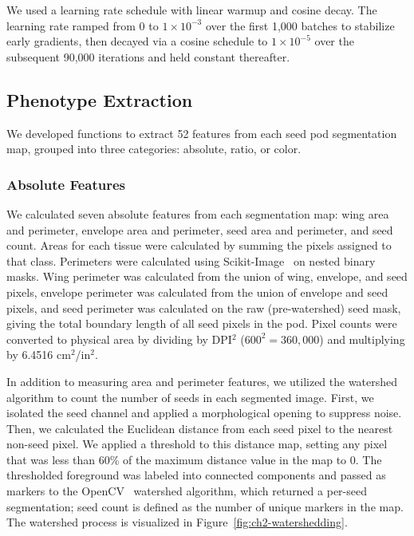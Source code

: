 We used a learning rate schedule with linear warmup and cosine decay. The learning rate ramped from 0 to $1\!\times\!10^{-3}$ over the first 1,000 batches to stabilize early gradients, then decayed via a cosine schedule to $1\!\times\!10^{-5}$ over the subsequent 90,000 iterations and held constant thereafter.

\subsection{Phenotype Extraction}\label{sec:ch2-phenotype-extraction}

We developed functions to extract 52 features from each seed pod segmentation map, grouped into three categories: absolute, ratio, or color.

\subsubsection{Absolute Features}

We calculated seven absolute features from each segmentation map: wing area and perimeter, envelope area and perimeter, seed area and perimeter, and seed count. Areas for each tissue were calculated by summing the pixels assigned to that class. Perimeters were calculated using Scikit-Image~\cite{scikit-image} on nested binary masks. Wing perimeter was calculated from the union of wing, envelope, and seed pixels, envelope perimeter was calculated from the union of envelope and seed pixels, and seed perimeter was calculated on the raw (pre-watershed) seed mask, giving the total boundary length of all seed pixels in the pod. Pixel counts were converted to physical area by dividing by DPI$^2$ ($600^2=360,000$) and multiplying by 6.4516 cm$^2$/in$^2$.

In addition to measuring area and perimeter features, we utilized the watershed algorithm to count the number of seeds in each segmented image. First, we isolated the seed channel and applied a morphological opening to suppress noise. Then, we calculated the Euclidean distance from each seed pixel to the nearest non-seed pixel. We applied a threshold to this distance map, setting any pixel that was less than 60\% of the maximum distance value in the map to 0. The thresholded foreground was labeled into connected components and passed as markers to the OpenCV~\cite{opencv_library} watershed algorithm, which returned a per-seed segmentation; seed count is defined as the number of unique markers in the map. The watershed process is visualized in Figure~\ref{fig:ch2-watershedding}.

